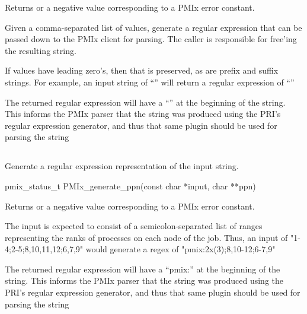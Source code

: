 Returns  or a negative value corresponding to a PMIx error constant.

\descr

Given a comma-separated list of  values, generate a regular expression that can be passed down to the \ac{PMIx} client for parsing.
The caller is responsible for free'ing the resulting string.

If values have leading zero's, then that is preserved, as are prefix and suffix strings. For example, an input string of ``'' will return a regular expression of ``''

\adviceuserstart
The returned regular expression will have a ``'' at the beginning of the string. This informs the \ac{PMIx} parser that the string was produced using the \ac{PRI}'s regular expression generator, and thus that same plugin should be used for parsing the string
\adviceuserend


\subsection{}

\summary

Generate a regular expression representation of the input string.

\format

\cspecificstart
\begin{codepar}
pmix_status_t PMIx_generate_ppn(const char *input, char **ppn)
\end{codepar}
\cspecificend

\begin{arglist}
\end{arglist}

Returns  or a negative value corresponding to a PMIx error constant.

\descr

The input is expected to consist of a semicolon-separated list of ranges representing the ranks of processes on each node of the job. Thus, an input of "1-4;2-5;8,10,11,12;6,7,9" would generate a regex of "pmix:2x(3);8,10-12;6-7,9"

\adviceuserstart
The returned regular expression will have a ``pmix:'' at the beginning of the string. This informs the \ac{PMIx} parser that the string was produced using the \ac{PRI}'s regular expression generator, and thus that same plugin should be used for parsing the string
\adviceuserend

